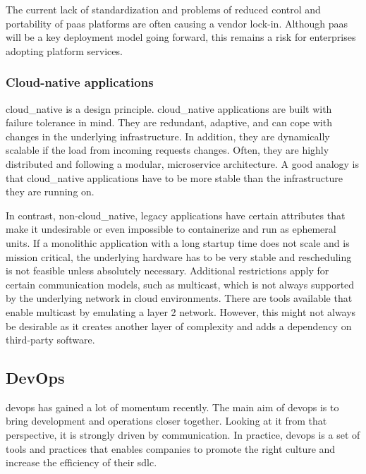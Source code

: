 \documentclass[../main.tex]{subfiles}
\begin{document}
    The current lack of standardization and problems of reduced control and portability of \acrshort{paas} platforms are often causing a vendor lock-in.
    Although \acrshort{paas} will be a key deployment model going forward, this remains a risk for enterprises adopting platform services.\cite{gartner_paas_trends}

    \subsubsection{Cloud-native applications}
    \label{subsubsec:cloud-native}

    \Gls{cloud_native} is a design principle.
    \Gls{cloud_native} applications are built with failure tolerance in mind.
    They are redundant, adaptive, and can cope with changes in the underlying infrastructure.
    In addition, they are dynamically scalable if the load from incoming requests changes.
    Often, they are highly distributed and following a modular, microservice architecture.
    A good analogy is that \gls{cloud_native} applications have to be more stable than the infrastructure they are running on.\cite{cna_patterns,cn_devops_with_k8s_c1}

    In contrast, non-\gls{cloud_native}, legacy applications have certain attributes that make it undesirable or even impossible to containerize and run as ephemeral units.
    If a monolithic application with a long startup time does not scale and is mission critical, the underlying hardware has to be very stable and rescheduling is not feasible unless absolutely necessary.
    Additional restrictions apply for certain communication models, such as multicast, which is not always supported by the underlying network in \gls{cloud} environments.
    There are tools available that enable multicast by emulating a layer 2 network.
    However, this might not always be desirable as it creates another layer of complexity and adds a dependency on third-party software.\cite{cna_patterns,cloud_multicast}

    \subsection{DevOps}
    \label{subsec:devops}

    \gls{devops} has gained a lot of momentum recently.
    The main aim of \gls{devops} is to bring development and operations closer together.
    Looking at it from that perspective, it is strongly driven by communication.
    In practice, \gls{devops} is a set of tools and practices that enables companies to promote the right culture and increase the efficiency of their \acrlong{sdlc}.\cite{cn_devops_with_k8s_c1,devops_surveys}
\end{document}
